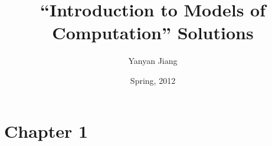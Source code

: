 \documentclass[11pt]{article}
\begin{document}
\newtheorem{thm}{定理}
\newtheorem{deff}[thm]{定义}
\newtheorem*{pf}{Proof}
\newtheorem{lem}[thm]{引理}

\title{\hei \bf ``Introduction to Models of Computation'' Solutions}
\author {Yanyan Jiang}
\date{\kai Spring, 2012}

\maketitle

\section{Chapter 1}























%

%

\newpage
\end{document}
